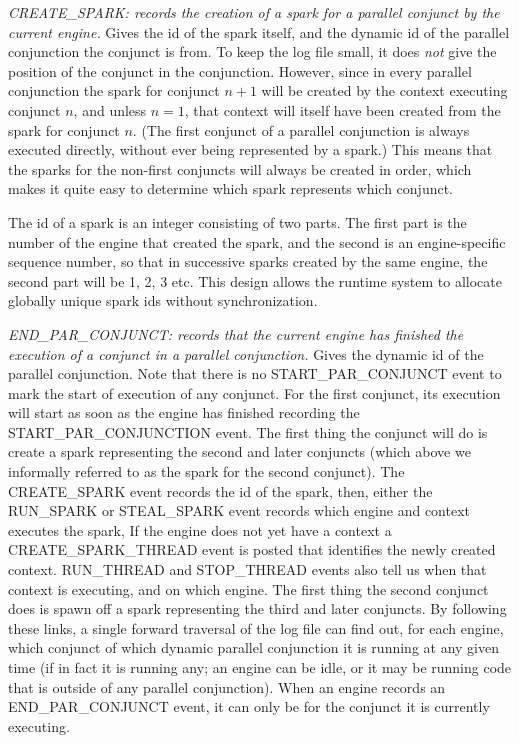 \emph{CREATE\_SPARK: records the creation of a spark
for a parallel conjunct by the current engine.}
Gives the id of the spark itself,
and the dynamic id of the parallel conjunction the conjunct is from.
To keep the log file small,
it does \emph{not} give the position of the conjunct in the conjunction.
However, since in every parallel conjunction
the spark for conjunct $n+1$
will be created by the context executing conjunct $n$,
and unless $n=1$, that context will itself have been created
from the spark for conjunct $n$.
(The first conjunct of a parallel conjunction is always executed directly,
without ever being represented by a spark.)
This means that the sparks for the non-first conjuncts
will always be created in order,
which makes it quite easy to determine which spark represents which conjunct.

The id of a spark is an integer consisting of two parts.
The first part is the number of the engine that created the spark,
and the second is an engine-specific sequence number,
so that in successive sparks created by the same engine,
the second part will be 1, 2, 3 etc.
This design allows the runtime system
to allocate globally unique spark ids without synchronization.

\emph{END\_PAR\_CONJUNCT:
records that the current engine
has finished the execution of a conjunct in a parallel conjunction.}
Gives the dynamic id of the parallel conjunction.
Note that there is no START\_PAR\_CONJUNCT event
to mark the start of execution of any conjunct.
For the first conjunct, its execution will start
as soon as the engine has finished recording the START\_PAR\_CONJUNCTION event.
The first thing the conjunct will do is create a spark
representing the second and later conjuncts
(which above we informally referred to as the spark for the second conjunct).
The CREATE\_SPARK event records the id of the spark,
then, either the RUN\_SPARK or STEAL\_SPARK event records which engine and context
executes the spark,
If the engine does not yet have a context a CREATE\_SPARK\_THREAD event is posted
that identifies the newly created context.
RUN\_THREAD and STOP\_THREAD events
also tell us when that context is executing, and on which engine.
The first thing the second conjunct does is spawn off a spark
representing the third and later conjuncts.
By following these links,
a single forward traversal of the log file can find out,
for each engine, which conjunct of which dynamic parallel conjunction
it is running at any given time
(if in fact it is running any;
an engine can be idle,
or it may be running code that is outside of any parallel conjunction).
When an engine records an END\_PAR\_CONJUNCT event,
it can only be for the conjunct it is currently executing.

